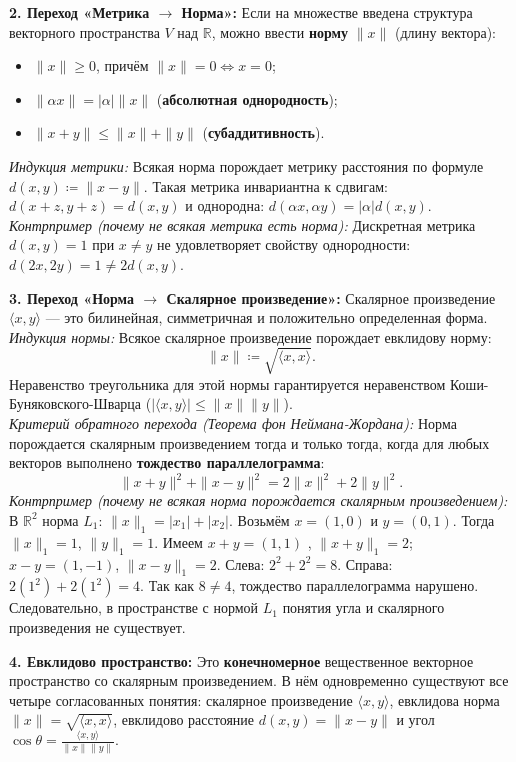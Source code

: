 \textbf{2.
Переход «Метрика $\to$ Норма»:} Если на множестве введена структура векторного пространства $V$ над $\mathbb{R}$, можно
ввести \textbf{норму} $\|x\|$ (длину вектора):
\begin{itemize}
    \item $\|x\| \ge 0$, причём $\|x\| = 0 \iff x = 0$;
    \item $\|\alpha x\| = |\alpha| \|x\|$ (\textbf{абсолютная однородность});
    \item $\|x + y\| \le \|x\| + \|y\|$ (\textbf{субаддитивность}).
\end{itemize}
\emph{Индукция метрики:} Всякая норма порождает метрику расстояния по формуле $d(x, y) \coloneqq \|x - y\|$.
Такая метрика инвариантна к сдвигам: $d(x+z, y+z)=d(x, y)$ и однородна: $d(\alpha x,\alpha y) = |\alpha| d(x, y)$.\\
\emph{Контрпример (почему не всякая метрика есть норма):} Дискретная метрика $d(x, y) = 1$ при $x \ne y$ не
удовлетворяет свойству однородности: $d(2x, 2y) = 1 \ne 2 d(x, y)$.

\textbf{3.
Переход «Норма $\to$ Скалярное произведение»:} Скалярное произведение $\langle x, y \rangle$ — это билинейная,
симметричная и положительно определенная форма.\\ \emph{Индукция нормы:} Всякое скалярное произведение порождает
евклидову норму:
\[ \|x\| \coloneqq \sqrt{\langle x, x \rangle}. \]
Неравенство треугольника для этой нормы гарантируется неравенством Коши-Буняковского-Шварца ($|\langle x, y \rangle| \le
\|x\| \|y\|$).\\ \emph{Критерий обратного перехода (Теорема фон Неймана-Жордана):} Норма порождается скалярным
произведением тогда и только тогда, когда для любых векторов выполнено \textbf{тождество параллелограмма}:
\[ \|x + y\|^2 + \|x - y\|^2 = 2\|x\|^2 + 2\|y\|^2. \]
\emph{Контрпример (почему не всякая норма порождается скалярным произведением):} В $\mathbb{R}^2$ норма $L_1$: $\|x\|_1
= |x_1| + |x_2|$.
Возьмём $x = (1, 0)$ и $y = (0, 1)$.
Тогда $\|x\|_1 = 1$, $\|y\|_1 = 1$.
Имеем $x+y = (1, 1)$ , $\|x+y\|_1 = 2$; $x-y = (1, -1)$, $\|x-y\|_1 = 2$.
Слева: $2^2 + 2^2 = 8$.
Справа: $2(1^2) + 2(1^2) = 4$.
Так как $8 \ne 4$, тождество параллелограмма нарушено.
Следовательно, в пространстве с нормой $L_1$ понятия угла и скалярного произведения не существует.

\textbf{4.
Евклидово пространство:} Это \textbf{конечномерное} вещественное векторное пространство со скалярным произведением.
В нём одновременно существуют все четыре согласованных понятия: скалярное произведение $\langle x, y \rangle$, евклидова
норма $\|x\| = \sqrt{\langle x, x \rangle}$, евклидово расстояние $d(x, y) = \|x - y\|$ и угол $\cos \theta =
\frac{\langle x, y \rangle}{\|x\| \|y\|}$.

\newpage